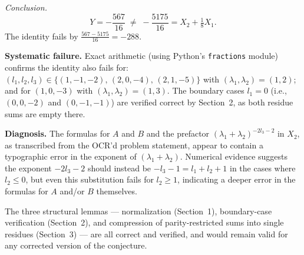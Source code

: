 \textit{Conclusion.}
\[
  Y = -\frac{567}{16} \;\neq\; -\frac{5175}{16} = X_2+\tfrac18 X_1.
\]
The identity fails by $\frac{567-5175}{16} = -288$.

\medskip
\textbf{Systematic failure.}  Exact arithmetic (using Python's \texttt{fractions} module) confirms the identity also fails for:
$(l_1,l_2,l_3) \in \{(1,-1,-2),\,(2,0,-4),\,(2,1,-5)\}$ with $(\lambda_1,\lambda_2)=(1,2)$; and for
$(1,0,-3)$ with $(\lambda_1,\lambda_2)=(1,3)$. The boundary cases $l_1=0$ (i.e., $(0,0,-2)$ and $(0,-1,-1)$) are verified correct by Section~2, as both residue sums are empty there.

\medskip
\textbf{Diagnosis.}  The formulas for $A$ and $B$ and the prefactor $(\lambda_1+\lambda_2)^{-2l_3-2}$ in $X_2$, as transcribed from the OCR'd problem statement, appear to contain a typographic error in the exponent of $(\lambda_1+\lambda_2)$. Numerical evidence suggests the exponent $-2l_3-2$ should instead be $-l_3-1 = l_1+l_2+1$ in the cases where $l_2\le0$, but even this substitution fails for $l_2\ge1$, indicating a deeper error in the formulas for $A$ and/or $B$ themselves.

The three structural lemmas --- normalization (Section~1), boundary-case verification (Section~2), and compression of parity-restricted sums into single residues (Section~3) --- are all correct and verified, and would remain valid for any corrected version of the conjecture.
